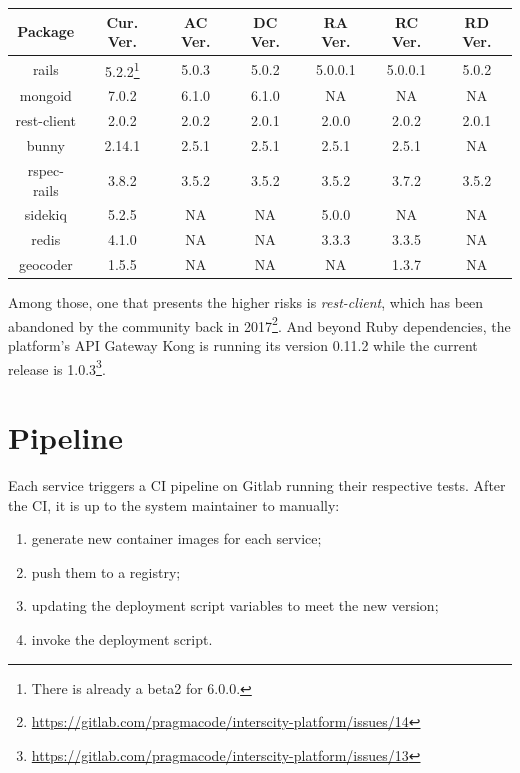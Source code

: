\documentclass[paper=a4, fontsize=11pt]{scrartcl}
\numberwithin{equation}{section}    %
\numberwithin{figure}{section}      %
\numberwithin{table}{section}        %
\begin{document}
  \begin{center}
    \begin{tabu} to \textwidth {  c | c | c | c | c | c | c }
      \textbf{Package} & \textbf{Cur. Ver.} & \textbf{AC Ver.} & \textbf{DC Ver.} & \textbf{RA Ver.} & \textbf{RC Ver.} & \textbf{RD Ver.} \\ \hline \hline
      rails & 5.2.2\footnote{There is already a beta2 for 6.0.0.} & 5.0.3 & 5.0.2 & 5.0.0.1 & 5.0.0.1 & 5.0.2 \\ \hline
      mongoid & 7.0.2 & 6.1.0 & 6.1.0 & NA & NA & NA \\ \hline
      rest-client & 2.0.2 & 2.0.2 & 2.0.1 & 2.0.0 & 2.0.2 & 2.0.1 \\ \hline
      bunny & 2.14.1 & 2.5.1 & 2.5.1 & 2.5.1 & 2.5.1 & NA \\ \hline
      rspec-rails & 3.8.2 & 3.5.2 & 3.5.2 & 3.5.2 & 3.7.2 & 3.5.2 \\ \hline
      sidekiq & 5.2.5 & NA & NA & 5.0.0 & NA & NA \\ \hline
      redis & 4.1.0 & NA & NA & 3.3.3 & 3.3.5 & NA \\ \hline
      geocoder & 1.5.5 & NA & NA & NA & 1.3.7 & NA \\
    \end{tabu}
  \end{center}

  Among those, one that presents the higher risks is \textit{rest-client}, which has been abandoned by the community back in 2017\footnote{\url{https://gitlab.com/pragmacode/interscity-platform/issues/14}}. And beyond Ruby dependencies, the platform's API Gateway Kong is running its version 0.11.2 while the current release is 1.0.3\footnote{\url{https://gitlab.com/pragmacode/interscity-platform/issues/13}}.

\section{Pipeline}
  Each service triggers a CI pipeline on Gitlab running their respective tests. After the CI, it is up to the system maintainer to manually:

  \begin{enumerate}
    \item generate new container images for each service;
    \item push them to a registry;
    \item updating the deployment script variables to meet the new version;
    \item invoke the deployment script.
  \end{enumerate}
\end{document}
